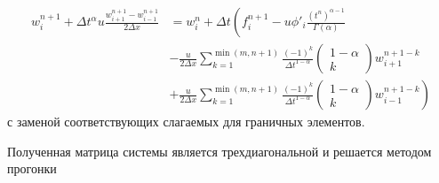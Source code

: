 
\begin{equation}
	\begin{split}
		w_i^{n+1} + \Delta t^{\alpha} u \frac{w_{i+1}^{n+1} - w_{i-1}^{n+1}}{2 \Delta x}
		&= w_i^{n} + \Delta t
		\left(
			f_i^{n+1} - u \phi'_{i}\frac{\left(t^n\right)^{\alpha - 1}}{\Gamma(\alpha)}
		\right.\\
			&- \frac{u}{2 \Delta x}
			\sum_{k=1}^{\min (m,n+1)}
			\frac{(-1)^k}{\Delta t^{1-\alpha}} \begin{pmatrix} 1 - \alpha \\ k \end{pmatrix}
			w^{n+1-k}_{i+1}\\
		&\left.
			+ \frac{u}{2 \Delta x}
			\sum_{k=1}^{\min (m,n+1)}
			\frac{(-1)^k}{\Delta t^{1-\alpha}} \begin{pmatrix} 1 - \alpha \\ k \end{pmatrix}
			w^{n+1-k}_{i-1}
		\right)
	\end{split}
\end{equation}
с заменой соответствующих слагаемых для граничных элементов.

Полученная матрица системы является трехдиагональной и решается методом прогонки

